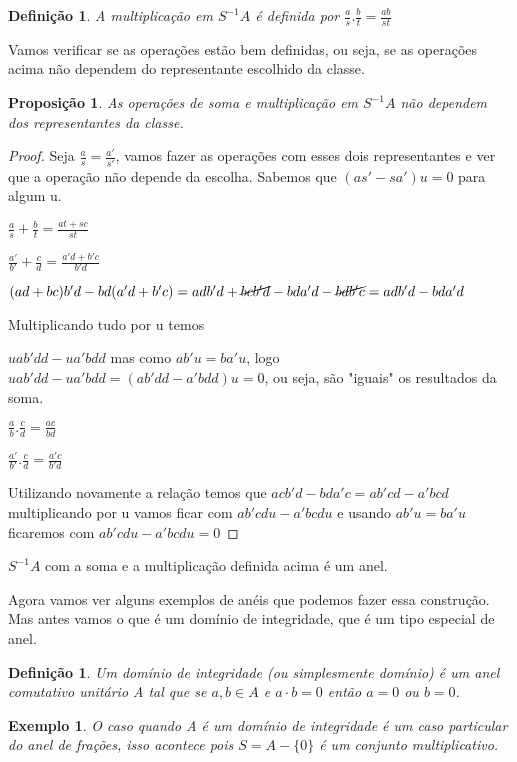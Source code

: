 \documentclass[10pt,a4paper]{article}
\newtheorem{proposition}[theorem]{Proposição}
\newtheorem{example}[theorem]{Exemplo}
\newtheorem{definition}[theorem]{Definição}
\begin{document}
\begin{definition}
	A multiplicação em $S^{-1}A$ é definida por $\frac{a}{s} . \frac{b}{t} = \frac{ab}{st}$
\end{definition}

Vamos verificar se as operações estão bem definidas, ou seja, se as operações acima não dependem do representante escolhido da classe.

\begin{proposition}
	As operações de soma e multiplicação em $S^{-1}A$ não dependem dos representantes da classe.
\end{proposition}

\begin{proof}
	Seja $\frac{a}{s}=\frac{a'}{s'}$, vamos fazer as operações com esses dois representantes e ver que a operação não depende da escolha. Sabemos que $(as'-sa')u=0$ para algum u.
	
	$\frac{a}{s} + \frac{b}{t}=\frac{at+sc}{st}$
	
	$\frac{a'}{b'} + \frac{c}{d}=\frac{a'd+b'c}{b'd}$
	
	$(ad+bc)b'd-bd(a'd+b'c)=adb'd+\cancel{bcb'd}-bda'd-\cancel{bdb'c}=adb'd-bda'd$
	
	Multiplicando tudo por u temos 
	
	$uab'dd-ua'bdd$ mas como $ab'u=ba'u$, logo $uab'dd-ua'bdd=(ab'dd-a'bdd)u=0$, ou seja, são "iguais" os resultados da soma.
	
	$\frac{a}{b} . \frac{c}{d} = \frac{ac}{bd}$
	
	$\frac{a'}{b'} . \frac{c}{d} = \frac{a'c}{b'd}$
	
	Utilizando novamente a relação temos que $acb'd-bda'c=ab'cd-a'bcd$ multiplicando por u vamos ficar com $ab'cdu-a'bcdu$ e usando $ab'u=ba'u$ ficaremos com $ab'cdu-a'bcdu=0$
\end{proof}

$S^{-1}A$ com a soma e a multiplicação definida acima é um anel.

Agora vamos ver alguns exemplos de anéis que podemos fazer essa construção. Mas antes vamos o que é um domínio de integridade, que é um tipo especial de anel.

\begin{definition}
	Um domínio de integridade (ou simplesmente domínio) é um anel comutativo unitário A tal que se $a, b \in A$ e $a\cdot b=0$ então $a=0$ ou $b=0$.
\end{definition}

\begin{example}
	O caso quando A é um domínio de integridade é um caso particular do anel de frações, isso acontece pois $S=A-\{0\}$ é um conjunto multiplicativo. 
\end{example}
\end{document}
